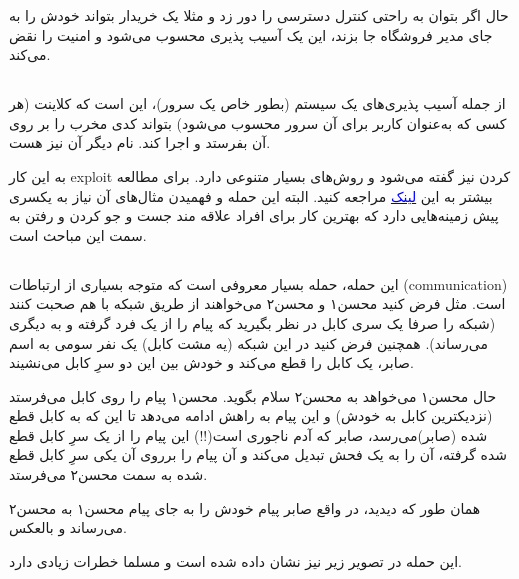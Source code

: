 \documentclass[]{article}
\begin{document}
حال اگر بتوان به راحتی کنترل دسترسی را دور زد و مثلا یک خریدار بتواند خودش را به جای مدیر فروشگاه جا بزند، این یک آسیب پذیری محسوب می‌شود و امنیت را نقض می‌کند.


\subsection*{{}}
از جمله آسیب پذیری‌های یک سیستم (‌بطور خاص یک سرور)، این است که کلاینت (هر کسی که به‌عنوان کاربر برای آن سرور محسوب می‌شود) بتواند کدی مخرب را بر روی آن بفرستد و اجرا کند. نام دیگر آن  نیز هست.



به این کار exploit کردن نیز گفته می‌شود و روش‌های بسیار متنوعی دارد. برای مطالعه بیشتر به این \href{https://owasp.org/www-community/attacks/Code_Injection}{\textcolor{blue}{لینک}}  مراجعه کنید. البته این حمله و فهمیدن مثال‌‌های آن نیاز به یکسری پیش زمینه‌هایی دارد که بهترین کار برای افراد علاقه مند جست و جو کردن و رفتن به سمت این مباحث است. 



\subsection*{{}}
این حمله، حمله بسیار معروفی است که متوجه بسیاری از ارتباطات (‌communication) است. مثل فرض کنید محسن۱ و محسن۲  می‌خواهند از طریق شبکه با هم صحبت کنند (شبکه را صرفا یک سری کابل در نظر بگیرید که پیام را از یک فرد گرفته و به دیگری می‌رساند). همچنین فرض کنید در این شبکه (یه مشت کابل)‌ یک نفر سومی به اسم صابر، یک کابل را قطع می‌‌کند و خودش بین این دو سرِ کابل می‌نشیند.

\bigskip

حال محسن۱ می‌خواهد به محسن۲ سلام بگوید. محسن۱ پیام را روی کابل می‌فرستد (نزدیکترین کابل به خودش) و این پیام به راهش ادامه می‌دهد تا این که به کابل قطع شده (صابر)‌می‌رسد، صابر که آدم ناجوری است(!!) این پیام را از یک سرِ کابل قطع شده گرفته، آن را به یک فحش تبدیل می‌کند و آن پیام را برروی آن یکی سرِ کابل قطع شده به سمت محسن۲ می‌فرستد.

همان طور که دیدید، در واقع صابر پیام خودش را به جای پیام محسن۱ به محسن۲ می‌رساند و بالعکس.

\bigskip
این حمله در تصویر زیر نیز نشان داده شده است و مسلما خطرات زیادی دارد.
\end{document}
